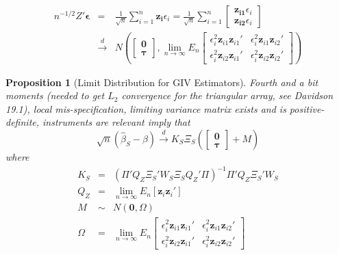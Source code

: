 \documentclass[12pt]{article}
\newtheorem{pro}{Proposition}[section]
\theoremstyle{definition}
\begin{document}
\begin{eqnarray*}
   n^{-1/2}Z'\boldsymbol{\epsilon}  &=& \frac{1}{\sqrt{n}}\sum_{i=1}^n \mathbf{z_i}\epsilon_i  = \frac{1}{\sqrt{n}}\sum_{i=1}^n \left[\begin{array}
     {c} \mathbf{z_{i1}} \epsilon_i  \\ \mathbf{z_{i2}} \epsilon_i 
   \end{array}\right]\\
         &\overset{d}{\rightarrow}& N\left(\left[\begin{array}
           {c} \mathbf{0} \\ \boldsymbol{\tau}
         \end{array}\right], \lim_{n\rightarrow \infty}E_n \left[\begin{array}
           {cc} 
           \epsilon_i^2 \mathbf{z}_{i1}\mathbf{z}_{i1}' & \epsilon_i^2 \mathbf{z}_{i1}\mathbf{z}_{i2}'\\
           \epsilon_i^2 \mathbf{z}_{i2}\mathbf{z}_{i1}' & \epsilon_i^2 \mathbf{z}_{i2}\mathbf{z}_{i2}'
          \end{array}\right] \right)
\end{eqnarray*}

\begin{pro}[Limit Distribution for GIV Estimators]
  Fourth and a bit moments (needed to get $L_2$ convergence for the triangular array, see Davidson 19.1), local mis-specification, limiting variance matrix exists and is positive-definite, instruments are relevant imply that
    $$\sqrt{n}\left(\widehat{\beta}_S - \beta \right) \overset{d}{\rightarrow} K_S \Xi_S \left(\left[\begin{array}
           {c} \mathbf{0} \\ \boldsymbol{\tau}
         \end{array}\right] + M \right)$$
  where
      \begin{eqnarray*}
        K_S &=& \left(\Pi' Q_Z \Xi_S' W_S \Xi_S Q_Z' \Pi\right)^{-1} \Pi'Q_Z \Xi_S'W_S\\
        Q_Z &=&\lim_{n\rightarrow \infty}E_n[\mathbf{z}_i \mathbf{z}_i'] \\
        M &\sim& N(\mathbf{0}, \Omega)\\
        \Omega &=& \lim_{n\rightarrow \infty}E_n \left[\begin{array}
           {cc} 
           \epsilon_i^2 \mathbf{z}_{i1}\mathbf{z}_{i1}' & \epsilon_i^2 \mathbf{z}_{i1}\mathbf{z}_{i2}'\\
           \epsilon_i^2 \mathbf{z}_{i2}\mathbf{z}_{i1}' & \epsilon_i^2 \mathbf{z}_{i2}\mathbf{z}_{i2}'
          \end{array}\right]
      \end{eqnarray*}
\end{pro}
\end{document}
